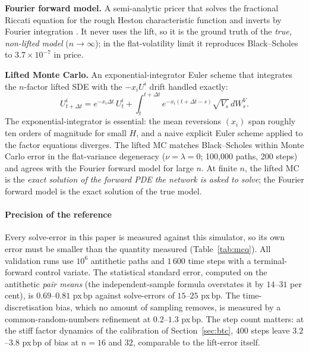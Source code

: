 \documentclass[preprint,12pt]{elsarticle}
\newcommand{\bp}{\ensuremath{\,\mathrm{bp}}}
\begin{document}
\textbf{Fourier forward model.} A semi-analytic pricer that solves the
fractional Riccati equation for the rough Heston characteristic function
\citep{eleuch2019characteristic} and inverts by Fourier integration
\citep{carr1999option}. It never uses the lift, so it is the ground truth of the
\emph{true, non-lifted model} ($n\to\infty$); in the flat-volatility limit it
reproduces Black--Scholes to $3.7\times10^{-7}$ in price.

\textbf{Lifted Monte Carlo.} An exponential-integrator Euler scheme that
integrates the $n$-factor lifted SDE with the $-x_i U^i$ drift handled exactly:
\begin{equation}
  U^i_{t+\Delta t} = e^{-x_i\Delta t}\,U^i_t
    + \int_t^{t+\Delta t}e^{-x_i(t+\Delta t - s)}\sqrt{V_s}\,dW^V_s.
  \label{eq:expint}
\end{equation}
The exponential-integrator is essential: the mean reversions $(x_i)$ span roughly
ten orders of magnitude for small $H$, and a naive explicit Euler scheme applied
to the factor equations diverges. The lifted MC matches Black--Scholes within
Monte Carlo error in the flat-variance degeneracy ($\nu{=}\lambda{=}0$;
100,000 paths, 200 steps) and agrees with the Fourier forward model for large
$n$. At finite $n$, the lifted MC is the \emph{exact solution of the forward PDE
the network is asked to solve}; the Fourier forward model is the exact solution
of the true model.

\paragraph{Precision of the reference} Every solve-error in this paper is
measured against this simulator, so its own error must be smaller than the
quantity measured (Table~\ref{tab:mcq}). All validation runs use $10^{6}$
antithetic paths and $1\,600$ time steps with a terminal-forward control variate.
The statistical standard error, computed on the antithetic \emph{pair means}
(the independent-sample formula overstates it by $14$--$31$ per cent), is
$0.69$--$0.81$ px\bp{} against solve-errors of $15$--$25$ px\bp{}. The
time-discretisation bias, which no amount of sampling removes, is measured by a
common-random-numbers refinement at $0.2$--$1.3$ px\bp{}. The step count matters:
at the stiff factor dynamics of the calibration of Section~\ref{sec:btc}, $400$
steps leave $3.2$--$3.8$ px\bp{} of bias at $n{=}16$ and $32$, comparable to the
lift-error itself.
\end{document}
